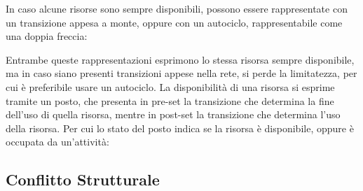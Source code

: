 \documentclass{article}
\numberwithin{equation}{subsection}
\begin{document}
In caso alcune risorse sono sempre disponibili, possono essere rappresentate con un transizione appesa a monte, oppure con un autociclo, rappresentabile come una doppia freccia: 
\begin{center}
\end{center}

Entrambe queste rappresentazioni esprimono lo stessa risorsa sempre disponibile, ma in caso siano presenti transizioni appese nella rete, si perde la limitatezza, per cui è 
preferibile usare un autociclo. La disponibilità di una risorsa si esprime tramite un posto, che presenta in pre-set la transizione che determina la fine dell'uso di 
quella risorsa, mentre in post-set la transizione che determina l'uso della risorsa. Per cui lo stato del posto indica se la risorsa è disponibile, oppure è occupata da 
un'attività:
\begin{center}
\end{center}

\subsection{Conflitto Strutturale}
\end{document}
